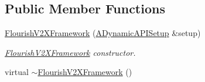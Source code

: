 \subsection*{Public Member Functions}
\begin{DoxyCompactItemize}
\item 
\hyperlink{classFlourishV2XFramework_a81dbf090f0aab6fd6fa1e7926b90593a}{Flourish\+V2\+X\+Framework} (\hyperlink{classADynamicAPISetup}{A\+Dynamic\+A\+P\+I\+Setup} \&setup)
\begin{DoxyCompactList}\small\item\em \hyperlink{classFlourishV2XFramework}{Flourish\+V2\+X\+Framework} constructor. \end{DoxyCompactList}\item 
virtual \hyperlink{classFlourishV2XFramework_a8b86274d692297621913399ec42e8aee}{$\sim$\+Flourish\+V2\+X\+Framework} ()\hypertarget{classFlourishV2XFramework_a8b86274d692297621913399ec42e8aee}{}\label{classFlourishV2XFramework_a8b86274d692297621913399ec42e8aee}


\end{DoxyCompactItemize}
